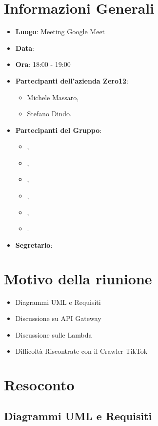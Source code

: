 \section{Informazioni Generali}

\begin{itemize}
\item{\textbf{Luogo}}: Meeting Google Meet
\item{\textbf{Data}}: \D{}
\item{\textbf{Ora}}: 18:00 - 19:00
\item{\textbf{Partecipanti dell'azienda Zero12}}: 
	\begin{itemize}
	\item{Michele Massaro,} 
	\item{Stefano Dindo.}
	\end{itemize} 
\item{\textbf{Partecipanti del Gruppo}}: 
	\begin{itemize}
	\item{\EP{},} 
	\item{\FP{},}
	\item{\GC{},}
	\item{\LW{},}	
	\item{\MB{},}
	\item{\PV{}.}
	\end{itemize} 
\item{\textbf{Segretario}}: \GC{}
\end{itemize}

\section{Motivo della riunione}
\begin{itemize}
\item{Diagrammi UML e Requisiti}
\item{Discussione su API Gateway}
\item{Discussione sulle Lambda}
\item{Difficoltà Riscontrate con il Crawler TikTok}
\end{itemize}

\section{Resoconto}

\subsection{Diagrammi UML e Requisiti}

